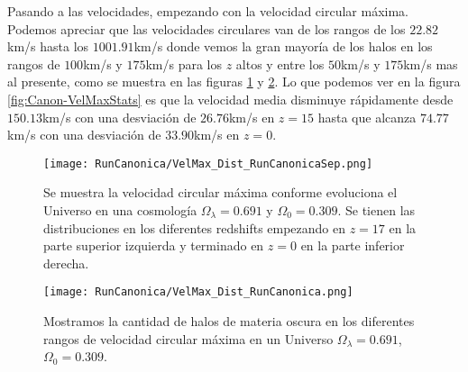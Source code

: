 Pasando a las velocidades, empezando con la velocidad circular máxima. Podemos apreciar que las velocidades circulares van de los rangos de los $22.82$km/s hasta los $1001.91$km/s donde vemos la gran mayoría de los halos en los rangos de $100$km/s y $175$km/s para los $z$ altos y entre los $50$km/s y $175$km/s mas al presente, como se muestra en las figuras \ref{fig:Canon-VelMaxDistSep} y \ref{fig:Canon-VelMaxDist}. Lo que podemos ver en la figura \ref{fig:Canon-VelMaxStats} es que la velocidad  media disminuye rápidamente desde $150.13$km/s con una desviación de $26.76$km/s en $z=15$ hasta que alcanza $74.77$km/s con una desviación de $33.90$km/s en $z=0$.


\begin{figure}[H]
    \centering
    \texttt{[image: RunCanonica/VelMax\_Dist\_RunCanonicaSep.png]}
    \caption[Velocidad circular máxima]{\footnotesize Se muestra la velocidad circular máxima conforme evoluciona el Universo en una cosmología $\Omega_\lambda = 0.691 $ y $\Omega_0 = 0.309$. Se tienen las distribuciones en los diferentes redshifts empezando en $z=17$ en la parte superior izquierda y terminado en $z=0$ en la parte inferior derecha.}
    \label{fig:Canon-VelMaxDistSep}
\end{figure}

\begin{figure}[H]
    \centering
    \texttt{[image: RunCanonica/VelMax\_Dist\_RunCanonica.png]}
    \caption[Distribución de la velocidad circular máxima]{\footnotesize Mostramos la cantidad de halos de materia oscura en los diferentes rangos de velocidad circular máxima en un Universo $\Omega_\lambda = 0.691 $, $\Omega_0 = 0.309$.}
    \label{fig:Canon-VelMaxDist}
\end{figure}

